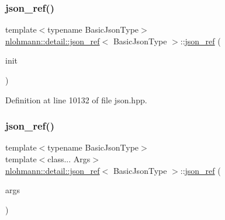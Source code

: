 \mbox{\label{classnlohmann_1_1detail_1_1json__ref_adfba2db547283a7c6a5df9a32e72efc5}} 
\subsubsection{\texorpdfstring{json\+\_\+ref()}{json\_ref()}\hspace{0.1cm}{\footnotesize\ttfamily [3/6]}}
{\footnotesize\ttfamily template$<$typename Basic\+Json\+Type$>$ \\
\hyperlink{classnlohmann_1_1detail_1_1json__ref}{nlohmann\+::detail\+::json\+\_\+ref}$<$ Basic\+Json\+Type $>$\+::\hyperlink{classnlohmann_1_1detail_1_1json__ref}{json\+\_\+ref} (\begin{DoxyParamCaption}\item[{std\+::initializer\+\_\+list$<$ \hyperlink{classnlohmann_1_1detail_1_1json__ref}{json\+\_\+ref}$<$ Basic\+Json\+Type $>$ $>$}]{init }\end{DoxyParamCaption})\hspace{0.3cm}{\ttfamily [inline]}}



Definition at line 10132 of file json.\+hpp.

\mbox{\label{classnlohmann_1_1detail_1_1json__ref_abe3ef8c2f07430bd5699bbd552f9e9c3}} 
\subsubsection{\texorpdfstring{json\+\_\+ref()}{json\_ref()}\hspace{0.1cm}{\footnotesize\ttfamily [4/6]}}
{\footnotesize\ttfamily template$<$typename Basic\+Json\+Type$>$ \\
template$<$class... Args$>$ \\
\hyperlink{classnlohmann_1_1detail_1_1json__ref}{nlohmann\+::detail\+::json\+\_\+ref}$<$ Basic\+Json\+Type $>$\+::\hyperlink{classnlohmann_1_1detail_1_1json__ref}{json\+\_\+ref} (\begin{DoxyParamCaption}\item[{Args \&\&...}]{args }\end{DoxyParamCaption})\hspace{0.3cm}{\ttfamily [inline]}}



